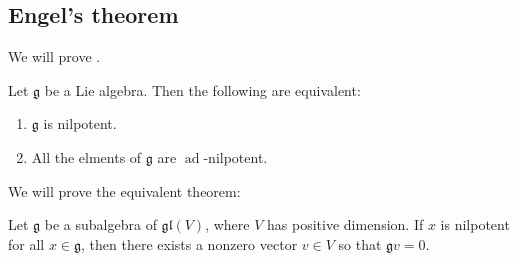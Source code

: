 \documentclass{article}
\DeclareMathOperator{\ad}{ad}
\newcommand{\frkg}{{\ensuremath{\mathfrak{g}}}}
\newcommand{\glalg}{\ensuremath{\mathfrak{gl}}}
\begin{document}
\subsection{Engel's theorem}

We will prove .

\begin{theorem}[Engel]
    Let $\frkg$ be a Lie algebra.
    Then the following are equivalent:
    \begin{enumerate}[label=(\roman*)]
        \item 
            $\frkg$ is nilpotent.
        \item 
            All the elments of $\frkg$ are $\ad$-nilpotent.
    \end{enumerate}
\end{theorem}

We will prove the equivalent theorem:

\begin{theorem}
    Let $\frkg$ be a subalgebra of $\glalg(V)$, where $V$ has positive dimension.
    If $x$ is nilpotent for all $x \in \frkg$, then there exists a nonzero vector $v \in V$ so that $\frkg v = 0$.
\end{theorem}
\end{document}
